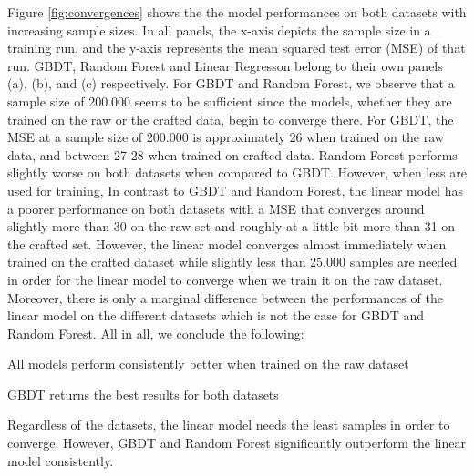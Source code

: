 Figure \ref{fig:convergences} shows the the model performances on both datasets with increasing sample sizes. In all panels, the x-axis depicts the sample size in a training run, and the y-axis represents the mean squared test error (MSE) of that run. GBDT, Random Forest and Linear Regresson belong to their own panels (a), (b), and (c) respectively. For GBDT and Random Forest, we observe that a sample size of 200.000 seems to be sufficient since the models, whether they are trained on the raw or the crafted data, begin to converge there. For GBDT, the MSE at a sample size of 200.000 is approximately 26 when trained on the raw data, and between 27-28 when trained on crafted data. Random Forest performs slightly worse on both datasets when compared to GBDT. However, when less are used for training, In contrast to GBDT and Random Forest, the linear model has a poorer performance on both datasets with a MSE that converges around slightly more than 30 on the raw set and roughly at a little bit more than 31 on the crafted set. However, the linear model converges almost immediately when trained on the crafted dataset while slightly less than 25.000 samples are needed in order for the linear model to converge when we train it on the raw dataset. Moreover, there is only a marginal difference between the performances of the linear model on the different datasets which is not the case for GBDT and Random Forest.
All in all, we conclude the following:
\begin{description}[font=$\bullet$\scshape\bfseries]
	\item All models perform consistently better when trained on the raw dataset
	\item GBDT returns the best results for both datasets
	\item Regardless of the datasets, the linear model needs the least samples in order to converge. However, GBDT and Random Forest significantly outperform the linear model consistently. 
\end{description}
